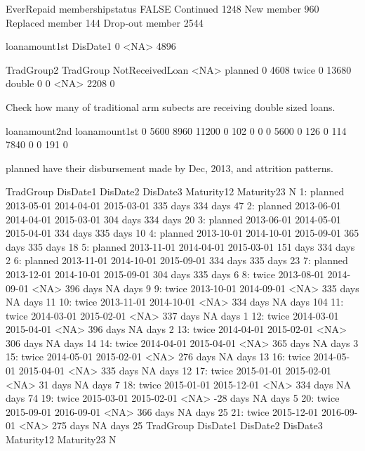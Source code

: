 \begin{Schunk}
\begin{Soutput}
                 EverRepaid
membershipstatus  FALSE
  Continued        1248
  New member        960
  Replaced member   144
  Drop-out member  2544
\end{Soutput}
\begin{Soutput}
        loanamount1st
DisDate1    0
    <NA> 4896
\end{Soutput}
\begin{Soutput}
         TradGroup2
TradGroup NotReceivedLoan  <NA>
  planned               0  4608
  twice                 0 13680
  double                0     0
  <NA>               2208     0
\end{Soutput}
\end{Schunk}
Check how many of traditional arm subects are receiving double sized loans.
\begin{Schunk}
\begin{Soutput}
             loanamount2nd
loanamount1st   0 5600 8960 11200
         0    102    0    0     0
         5600   0  126    0   114
         7840   0    0  191     0
\end{Soutput}
\end{Schunk}
\textsf{planned} have their disbursement made by Dec, 2013, and attrition patterns.
\begin{Schunk}
\begin{Soutput}
    TradGroup   DisDate1   DisDate2   DisDate3 Maturity12 Maturity23   N
 1:   planned 2013-05-01 2014-04-01 2015-03-01   335 days   334 days  47
 2:   planned 2013-06-01 2014-04-01 2015-03-01   304 days   334 days  20
 3:   planned 2013-06-01 2014-05-01 2015-04-01   334 days   335 days  10
 4:   planned 2013-10-01 2014-10-01 2015-09-01   365 days   335 days  18
 5:   planned 2013-11-01 2014-04-01 2015-03-01   151 days   334 days   2
 6:   planned 2013-11-01 2014-10-01 2015-09-01   334 days   335 days  23
 7:   planned 2013-12-01 2014-10-01 2015-09-01   304 days   335 days   6
 8:     twice 2013-08-01 2014-09-01       <NA>   396 days    NA days   9
 9:     twice 2013-10-01 2014-09-01       <NA>   335 days    NA days  11
10:     twice 2013-11-01 2014-10-01       <NA>   334 days    NA days 104
11:     twice 2014-03-01 2015-02-01       <NA>   337 days    NA days   1
12:     twice 2014-03-01 2015-04-01       <NA>   396 days    NA days   2
13:     twice 2014-04-01 2015-02-01       <NA>   306 days    NA days  14
14:     twice 2014-04-01 2015-04-01       <NA>   365 days    NA days   3
15:     twice 2014-05-01 2015-02-01       <NA>   276 days    NA days  13
16:     twice 2014-05-01 2015-04-01       <NA>   335 days    NA days  12
17:     twice 2015-01-01 2015-02-01       <NA>    31 days    NA days   7
18:     twice 2015-01-01 2015-12-01       <NA>   334 days    NA days  74
19:     twice 2015-03-01 2015-02-01       <NA>   -28 days    NA days   5
20:     twice 2015-09-01 2016-09-01       <NA>   366 days    NA days  25
21:     twice 2015-12-01 2016-09-01       <NA>   275 days    NA days  25
    TradGroup   DisDate1   DisDate2   DisDate3 Maturity12 Maturity23   N
\end{Soutput}
\end{Schunk}




